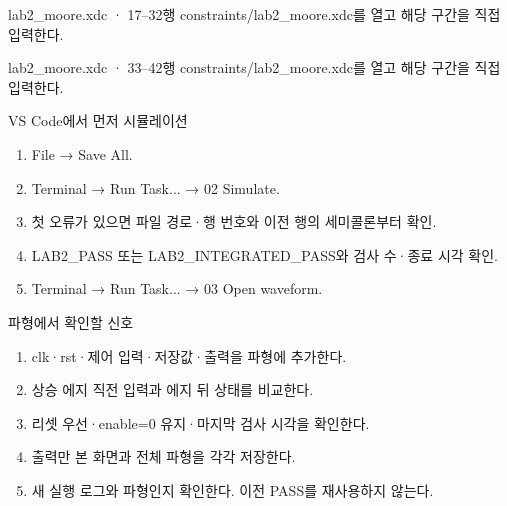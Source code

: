 \begin{frame}{lab2\_moore.xdc · 17–32행}
\small
constraints/lab2\_moore.xdc를 열고 해당 구간을 직접 입력한다.\par\vspace{0.4cm}\par\vspace{0.4cm}
\end{frame}

\begin{frame}{lab2\_moore.xdc · 33–42행}
\small
constraints/lab2\_moore.xdc를 열고 해당 구간을 직접 입력한다.\par\vspace{0.4cm}\par\vspace{0.4cm}
\end{frame}

\begin{frame}[label=simulation]{VS Code에서 먼저 시뮬레이션}
\small
\begin{enumerate}
\item File → Save All.
\item Terminal → Run Task... → 02 Simulate.
\item 첫 오류가 있으면 파일 경로·행 번호와 이전 행의 세미콜론부터 확인.
\item LAB2\_PASS 또는 LAB2\_INTEGRATED\_PASS와 검사 수·종료 시각 확인.
\item Terminal → Run Task... → 03 Open waveform.
\end{enumerate}
\end{frame}

\begin{frame}{파형에서 확인할 신호}
\small
\begin{enumerate}
\item clk·rst·제어 입력·저장값·출력을 파형에 추가한다.
\item 상승 에지 직전 입력과 에지 뒤 상태를 비교한다.
\item 리셋 우선·enable=0 유지·마지막 검사 시각을 확인한다.
\item 출력만 본 화면과 전체 파형을 각각 저장한다.
\item 새 실행 로그와 파형인지 확인한다. 이전 PASS를 재사용하지 않는다.
\end{enumerate}
\end{frame}

